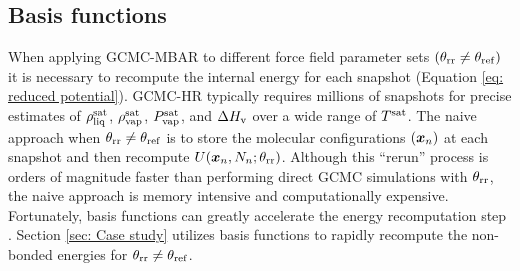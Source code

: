 \documentclass[journal=jced,manuscript=article]{achemso}
\newcommand{\bfv}[1]{{\mbox{\boldmath{$#1$}}}}
\newcommand{\x}{\bfv{x}}
\begin{document}

\subsection{Basis functions} \label{sec: Basis functions}

When applying GCMC-MBAR to different force field parameter sets $(\theta_{\rm rr} \neq \theta_{\rm ref})$ it is necessary to recompute the internal energy for each snapshot (Equation \ref{eq: reduced potential}). GCMC-HR typically requires millions of snapshots for precise estimates of $\rho_{\rm liq}^{\rm sat}$, $\rho_{\rm vap}^{\rm sat}$, $P_{\rm vap}^{\rm sat}$, and $\Delta H_{\rm v}$ over a wide range of $T^{\rm sat}$. The naive approach when $\theta_{\rm rr} \neq \theta_{\rm ref}$ is to store the molecular configurations $(\x_{n})$ at each snapshot and then recompute $U(\x_{n},N_n;\theta_{\rm rr})$. Although this ``rerun'' process is orders of magnitude faster than performing direct GCMC simulations with $\theta_{\rm rr}$, the naive approach is memory intensive and computationally expensive. Fortunately, basis functions can greatly accelerate the energy recomputation step \cite{naden:jctc:2016,Postdoc_1}. Section \ref{sec: Case study} utilizes basis functions to rapidly recompute the non-bonded energies for $\theta_{\rm rr} \neq \theta_{\rm ref}$.
\end{document}
